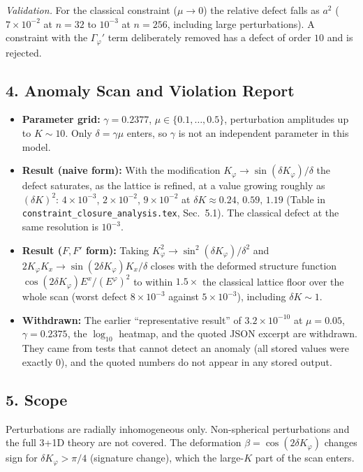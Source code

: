 \documentclass[12pt]{article}
\begin{document}
\emph{Validation.}  For the classical constraint ($\mu\to0$) the relative defect falls as $a^2$ ($7\times10^{-2}$ at $n=32$ to $10^{-3}$ at $n=256$, including large perturbations).  A constraint with the $\Gamma_\varphi'$ term deliberately removed has a defect of order $10$ and is rejected.

\subsection*{4. Anomaly Scan and Violation Report}
\begin{itemize}
  \item \textbf{Parameter grid:} $\gamma=0.2377$, $\mu \in \{0.1,\dots,0.5\}$, perturbation amplitudes up to $K\sim10$.  Only $\delta=\gamma\mu$ enters, so $\gamma$ is not an independent parameter in this model.
  \item \textbf{Result (naive form):} With the modification $K_\varphi\to\sin(\delta K_\varphi)/\delta$ the defect saturates, as the lattice is refined, at a value growing roughly as $(\delta K)^2$: $4\times10^{-3}$, $2\times10^{-2}$, $9\times10^{-2}$ at $\delta K\approx0.24,\,0.59,\,1.19$ (Table in \texttt{constraint\_closure\_analysis.tex}, Sec.~5.1).  The classical defect at the same resolution is $10^{-3}$.
  \item \textbf{Result ($F,F'$ form):} Taking $K_\varphi^2\to\sin^2(\delta K_\varphi)/\delta^2$ and $2K_\varphi K_x\to\sin(2\delta K_\varphi)K_x/\delta$ closes with the deformed structure function $\cos(2\delta K_\varphi)E^x/(E^\varphi)^2$ to within $1.5\times$ the classical lattice floor over the whole scan (worst defect $8\times10^{-3}$ against $5\times10^{-3}$), including $\delta K\sim1$.
  \item \textbf{Withdrawn:} The earlier ``representative result'' of $3.2\times10^{-10}$ at $\mu=0.05$, $\gamma=0.2375$, the $\log_{10}$ heatmap, and the quoted JSON excerpt are withdrawn.  They came from tests that cannot detect an anomaly (all stored values were exactly $0$), and the quoted numbers do not appear in any stored output.
\end{itemize}

\subsection*{5. Scope}
Perturbations are radially inhomogeneous only.  Non-spherical perturbations and the full 3+1D theory are not covered.  The deformation $\beta=\cos(2\delta K_\varphi)$ changes sign for $\delta K_\varphi>\pi/4$ (signature change), which the large-$K$ part of the scan enters.
\end{document}
